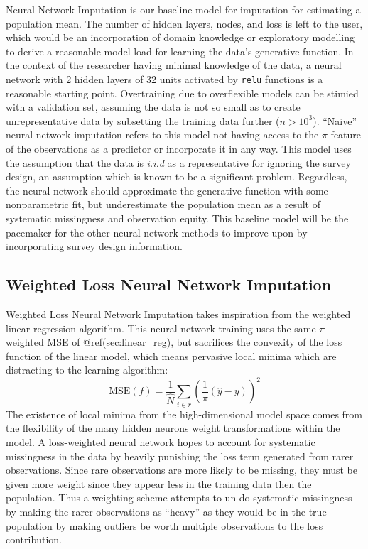 \documentclass[12pt,twoside]{reedthesis}
\begin{document}
Neural Network Imputation is our baseline model for imputation for
estimating a population mean. The number of hidden layers, nodes, and
loss is left to the user, which would be an incorporation of domain
knowledge or exploratory modelling to derive a reasonable model load for
learning the data's generative function. In the context of the
researcher having minimal knowledge of the data, a neural network with 2
hidden layers of 32 units activated by \texttt{relu} functions is a
reasonable starting point. Overtraining due to overflexible models can
be stimied with a validation set, assuming the data is not so small as
to create unrepresentative data by subsetting the training data further
(\(n > 10^3\)). ``Naive'' neural network imputation refers to this model
not having access to the \(\pi\) feature of the observations as a
predictor or incorporate it in any way. This model uses the assumption
that the data is \emph{i.i.d} as a representative for ignoring the
survey design, an assumption which is known to be a significant problem.
Regardless, the neural network should approximate the generative
function with some nonparametric fit, but underestimate the population
mean as a result of systematic missingness and observation equity. This
baseline model will be the pacemaker for the other neural network
methods to improve upon by incorporating survey design information.

\subsection{Weighted Loss Neural Network
Imputation}\label{weighted-loss-neural-network-imputation}

Weighted Loss Neural Network Imputation takes inspiration from the
weighted linear regression algorithm. This neural network training uses
the same \(\pi\)-weighted MSE of @ref(sec:linear\_reg), but sacrifices
the convexity of the loss function of the linear model, which means
pervasive local minima which are distracting to the learning algorithm:
\[
\text{MSE}(f) = \frac{1}{\hat N} \sum_{i \in r} (\frac{1}{\pi}(\hat{y} - y))^2
\] The existence of local minima from the high-dimensional model space
comes from the flexibility of the many hidden neurons weight
transformations within the model. A loss-weighted neural network hopes
to account for systematic missingness in the data by heavily punishing
the loss term generated from rarer observations. Since rare observations
are more likely to be missing, they must be given more weight since they
appear less in the training data then the population. Thus a weighting
scheme attempts to un-do systematic missingness by making the rarer
observations as ``heavy'' as they would be in the true population by
making outliers be worth multiple observations to the loss contribution.
\end{document}
